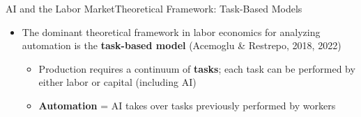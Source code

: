 \documentclass[hyperref={pdfpagelabels=false}]{beamer}
\begin{document}
\begin{frame}{AI and the Labor Market}{Theoretical Framework: Task-Based Models}
	\begin{itemize}
		\item The dominant theoretical framework in labor economics for analyzing automation is the \textbf{task-based model} (Acemoglu \& Restrepo, 2018, 2022)
		\vspace{0.2cm}
		\begin{itemize}
			\item Production requires a continuum of \textbf{tasks}; each task can be performed by either labor or capital (including AI)
			\vspace{0.2cm}
			\item \textbf{Automation} = AI takes over tasks previously performed by workers
		\end{itemize}
	\end{itemize}
\end{frame}
\end{document}
